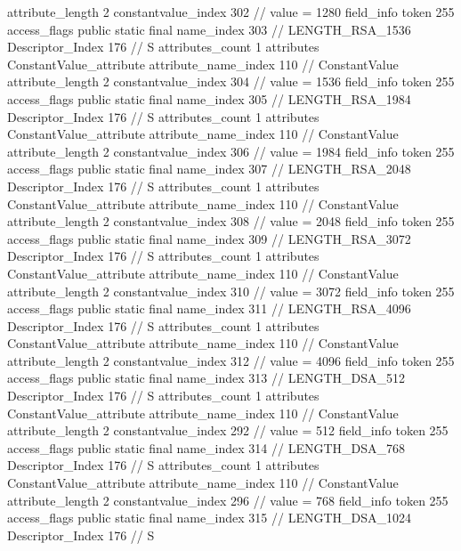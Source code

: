 {{{{{{{					attribute_length	2
					constantvalue_index	302		// value = 1280
				}
				}
			}
			field_info {
				token	255
				access_flags	public static final
				name_index	303		// LENGTH_RSA_1536
				Descriptor_Index	176		// S
				attributes_count	1
				attributes {
				ConstantValue_attribute {
					attribute_name_index	110		// ConstantValue
					attribute_length	2
					constantvalue_index	304		// value = 1536
				}
				}
			}
			field_info {
				token	255
				access_flags	public static final
				name_index	305		// LENGTH_RSA_1984
				Descriptor_Index	176		// S
				attributes_count	1
				attributes {
				ConstantValue_attribute {
					attribute_name_index	110		// ConstantValue
					attribute_length	2
					constantvalue_index	306		// value = 1984
				}
				}
			}
			field_info {
				token	255
				access_flags	public static final
				name_index	307		// LENGTH_RSA_2048
				Descriptor_Index	176		// S
				attributes_count	1
				attributes {
				ConstantValue_attribute {
					attribute_name_index	110		// ConstantValue
					attribute_length	2
					constantvalue_index	308		// value = 2048
				}
				}
			}
			field_info {
				token	255
				access_flags	public static final
				name_index	309		// LENGTH_RSA_3072
				Descriptor_Index	176		// S
				attributes_count	1
				attributes {
				ConstantValue_attribute {
					attribute_name_index	110		// ConstantValue
					attribute_length	2
					constantvalue_index	310		// value = 3072
				}
				}
			}
			field_info {
				token	255
				access_flags	public static final
				name_index	311		// LENGTH_RSA_4096
				Descriptor_Index	176		// S
				attributes_count	1
				attributes {
				ConstantValue_attribute {
					attribute_name_index	110		// ConstantValue
					attribute_length	2
					constantvalue_index	312		// value = 4096
				}
				}
			}
			field_info {
				token	255
				access_flags	public static final
				name_index	313		// LENGTH_DSA_512
				Descriptor_Index	176		// S
				attributes_count	1
				attributes {
				ConstantValue_attribute {
					attribute_name_index	110		// ConstantValue
					attribute_length	2
					constantvalue_index	292		// value = 512
				}
				}
			}
			field_info {
				token	255
				access_flags	public static final
				name_index	314		// LENGTH_DSA_768
				Descriptor_Index	176		// S
				attributes_count	1
				attributes {
				ConstantValue_attribute {
					attribute_name_index	110		// ConstantValue
					attribute_length	2
					constantvalue_index	296		// value = 768
				}
				}
			}
			field_info {
				token	255
				access_flags	public static final
				name_index	315		// LENGTH_DSA_1024
				Descriptor_Index	176		// S
}}}}}
